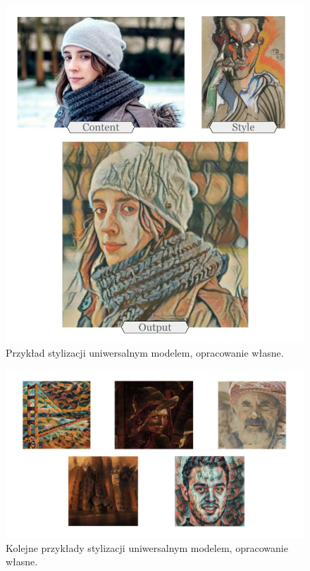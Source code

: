 \documentclass[12pt]{article}
\begin{document}
\begin{figure}[H]
    \centering
    \includegraphics[width=\textwidth]{u26.png}
    \caption{Przykład stylizacji uniwersalnym modelem, opracowanie własne.}
    \label{fig:17:1}
\end{figure}

\begin{figure}[H]
    \centering
    \includegraphics[width=\textwidth]{u27.png}
    \caption{Kolejne przykłady stylizacji uniwersalnym modelem, opracowanie własne.}
    \label{fig:17:2}
\end{figure}
\end{document}
